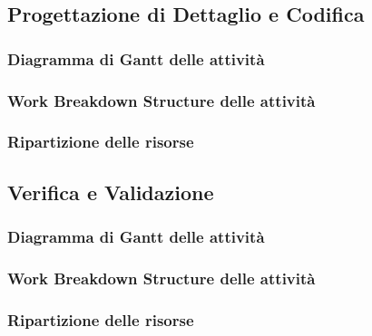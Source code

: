 \subsection{Progettazione di Dettaglio e Codifica}
\subsubsection{Diagramma di Gantt delle attività}
\subsubsection{Work Breakdown Structure delle attività}
\subsubsection{Ripartizione delle risorse}
\subsection{Verifica e Validazione}
\subsubsection{Diagramma di Gantt delle attività}
\subsubsection{Work Breakdown Structure delle attività}
\subsubsection{Ripartizione delle risorse}